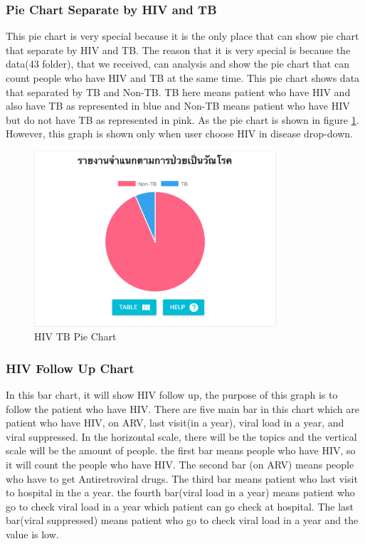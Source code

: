 	
        \subsubsection{Pie Chart Separate by HIV and TB}
        
        	This pie chart is very special because it is the only place that can show pie chart that separate by HIV and TB. The reason that it is very special is because the data(43 folder), that we received, can analysis and show the pie chart that can count people who have HIV and TB at the same time. This pie chart shows data that separated by TB and Non-TB. TB here means patient who have HIV and also have TB as represented in blue and Non-TB means patient who have HIV but do not have TB as represented in pink. As the pie chart is shown in figure \ref{pie-graph-hiv-tb}. However, this graph is shown only when user choose HIV in disease drop-down.
    	
    	\FloatBarrier
        	\begin{figure}[h!]
                \centering
            		\includegraphics[width=9cm]{images/chapter-05/pie-graph-hiv-tb.png}
            		\caption{HIV TB Pie Chart}
            		\label{pie-graph-hiv-tb}
            \end{figure}
    	\FloatBarrier
    	
    	\subsubsection{HIV Follow Up Chart}
    	
    	In this bar chart, it will show HIV follow up, the purpose of this graph is to follow the patient who have HIV. There are five main bar in this chart which are patient who have HIV, on ARV, last visit(in a year), viral load in a year, and viral suppressed. In the horizontal scale, there will be the topics and the vertical scale will be the amount of people. the first bar means people who have HIV, so it will count the people who have HIV. The second bar (on ARV) means people who have to get Antiretroviral drugs. The third bar means patient who last visit to hospital in the a year. the fourth bar(viral load in a year) means patient who go to check viral load in a year which patient can go check at hospital. The last bar(viral suppressed) means patient who go to check viral load in a year and the value is low.

